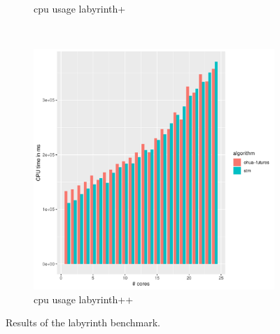 \begin{figure}
\begin{subfigure}[t]{.32\textwidth}
        \caption{cpu usage labyrinth+}%
    \end{subfigure}%
    ~
    \begin{subfigure}[t]{.32\textwidth}
        \includegraphics[width=\textwidth,keepaspectratio]{gfx/results/labyrinth/labyrinth++_cpu}
        \caption{cpu usage labyrinth++}%
    \end{subfigure}%
    \caption{Results of the labyrinth benchmark.}%
    \label{fig:evaulation:labyrinth}
\end{figure}


